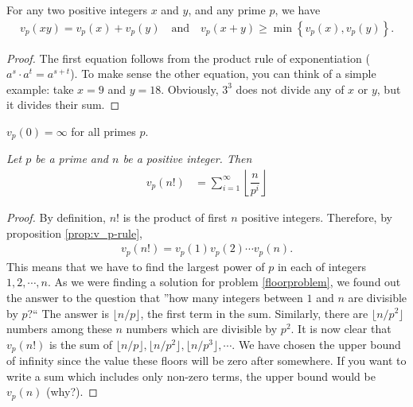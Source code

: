 \documentclass[12pt]{subfile}
\begin{document}
\begin{proposition} \label{prop:v_p-rule}
	For any two positive integers $x$ and $y$, and any prime $p$, we have
		\begin{align*}
		v_p(xy)=v_p(x)+v_p(y) \quad \text{and} \quad v_p(x+y)\geq\min\left\{v_p(x),v_p(y)\right\}.
		\end{align*}
\end{proposition}

\begin{proof}
	The first equation follows from the product rule of exponentiation ($a^{s} \cdot a^{t} = a^{s+t}$). To make sense the other equation, you can think of a simple example: take $x=9$ and $y=18$. Obviously, $3^3$ does not divide any of $x$ or $y$, but it divides their sum.
\end{proof}

\begin{note}
	$v_p(0)=\infty$ for all primes $p.$
\end{note}

\begin{theorem}\label{thm:legendre}\slshape
	Let $p$ be a prime and $n$ be a positive integer. Then
		\begin{align*}
		v_p(n!) & =\sum_{i=1}^{\infty}\left\lfloor\dfrac{n}{p^i}\right\rfloor
		\end{align*}
\end{theorem}

\begin{proof}
	By definition, $n!$ is the product of first $n$ positive integers. Therefore, by proposition \ref{prop:v_p-rule},
		\begin{align*}
			v_p(n!) = v_p(1) v_p(2) \cdots v_p(n).
		\end{align*}
	This means that we have to find the largest power of $p$ in each of integers $1,2,\cdots, n$. As we were finding a solution for problem \ref{floorproblem}, we found out the answer to the question that ''how many integers between $1$ and $n$ are divisible by $p$?`` The answer is $\lfloor n/p \rfloor$, the first term in the sum. Similarly, there are $\lfloor n/p^2 \rfloor$ numbers among these $n$ numbers which are divisible by $p^2$. It is now clear that $v_p(n!)$ is the sum of $\lfloor n/p \rfloor, \lfloor n/p^2 \rfloor, \lfloor n/p^3 \rfloor, \cdots$. We have chosen the upper bound of infinity since the value these floors will be zero after somewhere. If you want to write a sum which includes only non-zero terms, the upper bound would be $v_p(n)$ (why?).
\end{proof}
\end{document}
